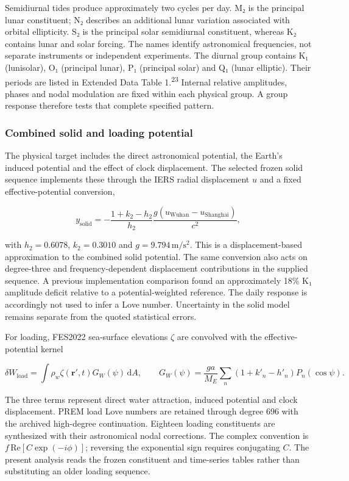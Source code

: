 \documentclass[
  12pt,
  a4paper,
]{article}
\begin{document}
Semidiurnal tides produce approximately two cycles per day. M₂ is the
principal lunar constituent; N₂ describes an additional lunar variation
associated with orbital ellipticity. S₂ is the principal solar
semidiurnal constituent, whereas K₂ contains lunar and solar forcing.
The names identify astronomical frequencies, not separate instruments or
independent experiments. The diurnal group contains K₁ (lunisolar), O₁
(principal lunar), P₁ (principal solar) and Q₁ (lunar elliptic). Their
periods are listed in Extended Data Table 1.\textsuperscript{23}
Internal relative amplitudes, phases and nodal modulation are fixed
within each physical group. A group response therefore tests that
complete specified pattern.

\hypertarget{combined-solid-and-loading-potential}{%
\subsubsection{Combined solid and loading
potential}\label{combined-solid-and-loading-potential}}

The physical target includes the direct astronomical potential, the
Earth's induced potential and the effect of clock displacement. The
selected frozen solid sequence implements these through the IERS radial
displacement \(u\) and a fixed effective-potential conversion,

\[y_{\mathrm{solid}}=-\frac{1+k_2-h_2}{h_2}\frac{g(u_{\mathrm{Wuhan}}-u_{\mathrm{Shanghai}})}{c^2},\]

with \(h_2=0.6078\), \(k_2=0.3010\) and \(g=9.794\,\mathrm{m/s^2}\).
This is a displacement-based approximation to the combined solid
potential. The same conversion also acts on degree-three and
frequency-dependent displacement contributions in the supplied sequence.
A previous implementation comparison found an approximately 18\% K₁
amplitude deficit relative to a potential-weighted reference. The daily
response is accordingly not used to infer a Love number. Uncertainty in
the solid model remains separate from the quoted statistical errors.

For loading, FES2022 sea-surface elevations \(\zeta\) are convolved with
the effective-potential kernel

\[\delta W_{\mathrm{load}}=\int \rho_w\zeta(\mathbf{r}',t)G_W(\psi)\,\mathrm{d}A,\qquad
G_W(\psi)=\frac{ga}{M_E}\sum_n(1+k'_n-h'_n)P_n(\cos\psi).\]

The three terms represent direct water attraction, induced potential and
clock displacement. PREM load Love numbers are retained through degree
696 with the archived high-degree continuation. Eighteen loading
constituents are synthesized with their astronomical nodal corrections.
The complex convention is \(f\,\mathrm{Re}[C\exp(-i\phi)]\); reversing
the exponential sign requires conjugating \(C\). The present analysis
reads the frozen constituent and time-series tables rather than
substituting an older loading sequence.
\end{document}
